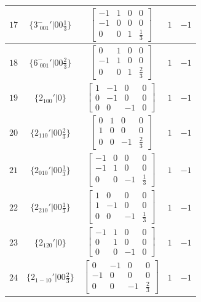 \documentclass[fleqn,8pt]{jsarticle}
\begin{document}
\begin{longtable}{ccccc}
$ 17 $ & $ \{3^{-}_{\,\,001}{}'|0 0 \frac{1}{3}\} $ & $ \begin{bmatrix} -1 & 1 & 0 & 0 \\ -1 & 0 & 0 & 0 \\ 0 & 0 & 1 & \frac{1}{3} \end{bmatrix} $ & $ 1 $ & $ -1 $ \\ \hline
$ 18 $ & $ \{6^{-}_{\,\,001}{}'|0 0 \frac{2}{3}\} $ & $ \begin{bmatrix} 0 & 1 & 0 & 0 \\ -1 & 1 & 0 & 0 \\ 0 & 0 & 1 & \frac{2}{3} \end{bmatrix} $ & $ 1 $ & $ -1 $ \\ \hline
$ 19 $ & $ \{2{}_{100}{}'|0\} $ & $ \begin{bmatrix} 1 & -1 & 0 & 0 \\ 0 & -1 & 0 & 0 \\ 0 & 0 & -1 & 0 \end{bmatrix} $ & $ 1 $ & $ -1 $ \\ \hline
$ 20 $ & $ \{2{}_{110}{}'|0 0 \frac{2}{3}\} $ & $ \begin{bmatrix} 0 & 1 & 0 & 0 \\ 1 & 0 & 0 & 0 \\ 0 & 0 & -1 & \frac{2}{3} \end{bmatrix} $ & $ 1 $ & $ -1 $ \\ \hline
$ 21 $ & $ \{2{}_{010}{}'|0 0 \frac{1}{3}\} $ & $ \begin{bmatrix} -1 & 0 & 0 & 0 \\ -1 & 1 & 0 & 0 \\ 0 & 0 & -1 & \frac{1}{3} \end{bmatrix} $ & $ 1 $ & $ -1 $ \\ \hline
$ 22 $ & $ \{2{}_{210}{}'|0 0 \frac{1}{3}\} $ & $ \begin{bmatrix} 1 & 0 & 0 & 0 \\ 1 & -1 & 0 & 0 \\ 0 & 0 & -1 & \frac{1}{3} \end{bmatrix} $ & $ 1 $ & $ -1 $ \\ \hline
$ 23 $ & $ \{2{}_{120}{}'|0\} $ & $ \begin{bmatrix} -1 & 1 & 0 & 0 \\ 0 & 1 & 0 & 0 \\ 0 & 0 & -1 & 0 \end{bmatrix} $ & $ 1 $ & $ -1 $ \\ \hline
$ 24 $ & $ \{2{}_{1-10}{}'|0 0 \frac{2}{3}\} $ & $ \begin{bmatrix} 0 & -1 & 0 & 0 \\ -1 & 0 & 0 & 0 \\ 0 & 0 & -1 & \frac{2}{3} \end{bmatrix} $ & $ 1 $ & $ -1 $ \\
\end{longtable}
\end{document}
